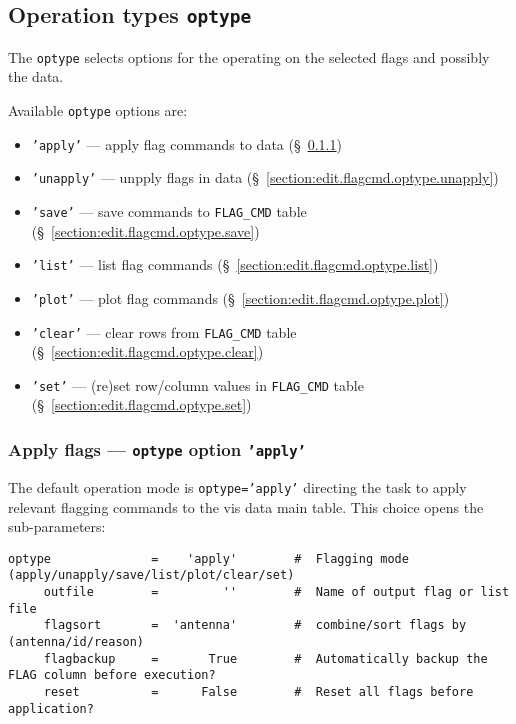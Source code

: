 \subsection{Operation types {\tt optype}}
\label{section:edit.flagcmd.optype}

The {\tt optype} selects options for the operating on the selected
flags and possibly the data.

Available {\tt optype} options are:
\begin{itemize}
   \item {\tt 'apply'} --- apply flag commands to data (\S~\ref{section:edit.flagcmd.optype.apply})
   \item {\tt 'unapply'} --- unpply flags in data (\S~\ref{section:edit.flagcmd.optype.unapply})
   \item {\tt 'save'} --- save commands to {\tt FLAG\_CMD} table (\S~\ref{section:edit.flagcmd.optype.save})
   \item {\tt 'list'} --- list flag commands (\S~\ref{section:edit.flagcmd.optype.list})
   \item {\tt 'plot'} --- plot flag commands (\S~\ref{section:edit.flagcmd.optype.plot})
   \item {\tt 'clear'} --- clear rows from {\tt FLAG\_CMD} table (\S~\ref{section:edit.flagcmd.optype.clear})
   \item {\tt 'set'} --- (re)set row/column values in {\tt FLAG\_CMD} table (\S~\ref{section:edit.flagcmd.optype.set})
\end{itemize}

\subsubsection{Apply flags --- {\tt optype} option {\tt 'apply'}}
\label{section:edit.flagcmd.optype.apply}

The default operation mode is {\tt optype='apply'} directing the
task to apply relevant flagging commands to the vis data main table.
This choice opens the sub-parameters:
\small
\begin{verbatim}
optype              =    'apply'        #  Flagging mode (apply/unapply/save/list/plot/clear/set)
     outfile        =         ''        #  Name of output flag or list file
     flagsort       =  'antenna'        #  combine/sort flags by (antenna/id/reason)
     flagbackup     =       True        #  Automatically backup the FLAG column before execution?
     reset          =      False        #  Reset all flags before application?
\end{verbatim}
\normalsize

